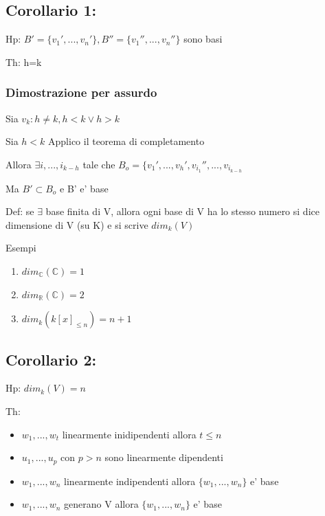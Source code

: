 \documentclass{article}
\begin{document}
\subsection*{Corollario 1:}
\begin{flushleft}
	Hp: $B' = \{ v_1',...,v_n' \},B'' = \{ v_1'',...,v_n'' \}$ sono basi
\end{flushleft}
\begin{flushleft}
	Th: h=k
\end{flushleft}
\subsubsection*{Dimostrazione per assurdo}
Sia $v_k : h\neq k, h<k \lor h>k$
\begin{flushleft}
	Sia $h<k$ Applico il teorema di completamento
\end{flushleft}
\begin{flushleft}
	Allora $\exists i,...,i_{k-h}$ tale che $B_o = \{ v_1',...,v_h',v_{i_1}'',...,v_{i_{k-h}}$
\end{flushleft}
\begin{flushleft}
	Ma $B' \subset B_o$ e B' e' base
\end{flushleft}
\begin{flushleft}
	Def: se $\exists$ base finita di V, allora ogni base di V ha lo stesso numero si dice dimensione di V (su K) e si scrive $dim_k(V)$
\end{flushleft}
Esempi
\begin{enumerate}
	\item $dim_{\mathbb{C}}(\mathbb{C})=1$
	\item $dim_{\mathbb{R}}(\mathbb{C})=2$
	\item $dim_k(k[x]_{\leq n})=n+1$
\end{enumerate}
\subsection*{Corollario 2:}
\begin{flushleft}
  Hp: $dim_k(V)=n$
\end{flushleft}
Th:
\begin{itemize}
  \item $w_1,...,w_t$ linearmente inidipendenti allora $t \leq n$
  \item $u_1,...,u_p$ con $p>n$ sono linearmente dipendenti
  \item $w_1,...,w_n$ linearmente indipendenti allora $\{w_1,...,w_n \}$ e' base
  \item $w_1,...,w_n$ generano V allora $\{w_1,...,w_n \}$ e' base 
\end{itemize}
\end{document}
